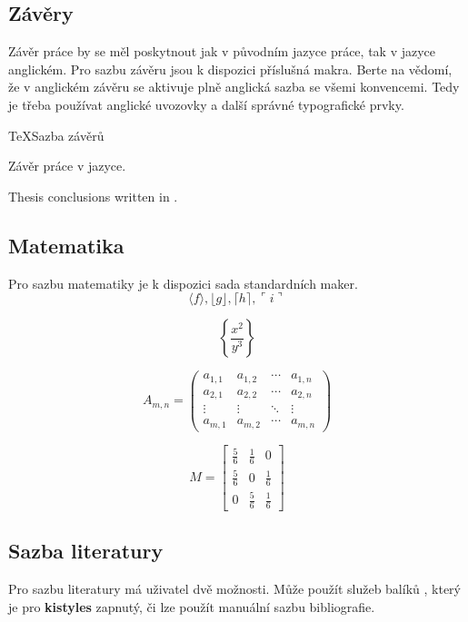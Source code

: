 \documentclass[
  field=inf,
  biblatex,
  glossaries,
  index
]{kidiplom}
\begin{document}
\subsection{Závěry}
Závěr práce by se měl poskytnout jak v původním jazyce práce, tak v jazyce anglickém. Pro sazbu závěru jsou k dispozici příslušná makra. Berte na vědomí, že v anglickém závěru se aktivuje plně anglická sazba se všemi konvencemi. Tedy je třeba používat anglické uvozovky a další správné typografické prvky.

\begin{kicode}{TeX}{}{Sazba závěrů}
\begin{kiconclusions}
Závěr práce v  jazyce.
\end{kiconclusions}

\begin{kiconclusions}[english]
Thesis conclusions written in .
\end{kiconclusions}
\end{kicode}

\subsection{Matematika}
Pro sazbu matematiky je k dispozici sada standardních maker.
$$\langle f \rangle, \lfloor g \rfloor,
\lceil h \rceil, \ulcorner i \urcorner$$

$$\left\{\frac{x^2}{y^3}\right\}$$

$$
A_{m,n} =
 \begin{pmatrix}
  a_{1,1} & a_{1,2} & \cdots & a_{1,n} \\
  a_{2,1} & a_{2,2} & \cdots & a_{2,n} \\
  \vdots  & \vdots  & \ddots & \vdots  \\
  a_{m,1} & a_{m,2} & \cdots & a_{m,n}
 \end{pmatrix}
$$

$$
M = \begin{bmatrix}
       \frac{5}{6} & \frac{1}{6} & 0           \\[0.3em]
       \frac{5}{6} & 0           & \frac{1}{6} \\[0.3em]
       0           & \frac{5}{6} & \frac{1}{6}
     \end{bmatrix}
$$

\subsection{Sazba literatury}
Pro sazbu literatury má uživatel dvě možnosti. Může použít služeb balíků \BibLaTeX{}, který je pro \textbf{kistyles} zapnutý, či lze použít manuální sazbu bibliografie.
\end{document}
